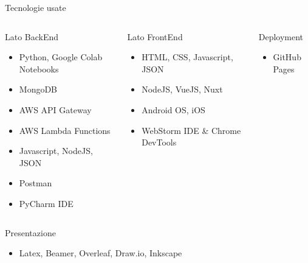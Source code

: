 \documentclass[xcolor=svgnames, aspectratio=169]{beamer}
\begin{document}
\begin{frame}{Tecnologie usate}
    \vspace*{-12pt}
    \begin{columns}[t] %
        \begin{block}{Lato BackEnd}
            \begin{itemize}
                \item Python, Google Colab Notebooks
                \item MongoDB
                \item AWS API Gateway
                \item AWS Lambda Functions
                \item Javascript, NodeJS, JSON
                \item Postman
                \item PyCharm IDE
            \end{itemize}
        \end{block}
        
        \begin{block}{Lato FrontEnd}
            \begin{itemize}
                \item HTML, CSS, Javascript, JSON
                \item NodeJS, VueJS, Nuxt
                \item Android OS, iOS
                \item WebStorm IDE \& Chrome DevTools
            \end{itemize}
        \end{block}
        \begin{block}{Deployment}
            \begin{itemize}
                \item GitHub Pages
            \end{itemize}
        \end{block}
    \end{columns}
    \begin{columns}[t] %
        \begin{block}{Presentazione}
            \begin{itemize}
                \item Latex, Beamer, Overleaf, Draw.io, Inkscape
            \end{itemize}
        \end{block}
    \end{columns}
\end{frame}
\end{document}
